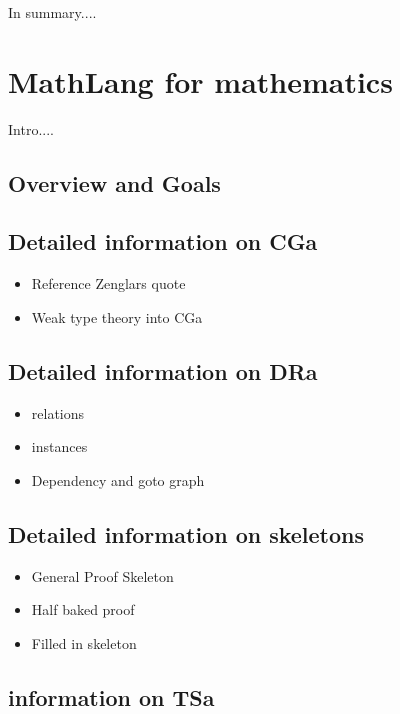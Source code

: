 In summary....

\section{MathLang for mathematics}

Intro....

\subsection{Overview and Goals}

\subsection{Detailed information on CGa}

\begin{itemize}
\item Reference Zenglars quote

\item Weak type theory into CGa

\end{itemize}

\subsection{Detailed information on DRa}

\begin{itemize}
\item relations

\item instances

\item Dependency and goto graph
\end{itemize}

\subsection{Detailed information on skeletons}

\begin{itemize}
\item General Proof Skeleton

\item Half baked proof

\item Filled in skeleton
\end{itemize}

\subsection{information on TSa}

